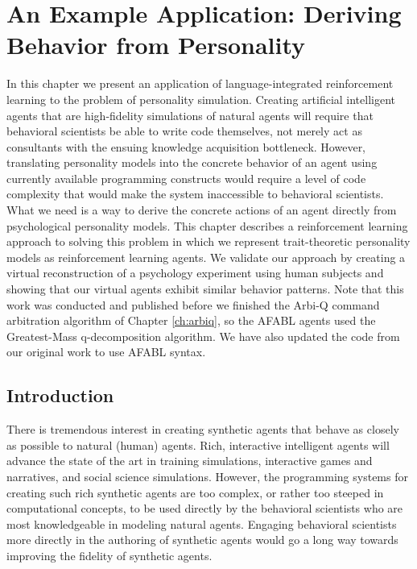 \chapter{An Example Application: Deriving Behavior from Personality}\label{ch:applications}

In this chapter we present an application of language-integrated reinforcement learning to the problem of personality simulation. Creating artificial intelligent agents that are high-fidelity simulations of natural agents will require that behavioral scientists be able to write code themselves, not merely act as consultants with the ensuing knowledge acquisition bottleneck. However, translating personality models into the concrete behavior of an agent using currently available programming constructs would require a level of code complexity that would make the system inaccessible to behavioral scientists.  What we need is a way to derive the concrete actions of an agent directly from psychological personality models.  This chapter describes a reinforcement learning approach to solving this problem in which we represent trait-theoretic personality models as reinforcement learning agents.  We validate our approach by creating a virtual reconstruction of a psychology experiment using human subjects and showing that our virtual agents exhibit similar behavior patterns. Note that this work was conducted and published before we finished the Arbi-Q command arbitration algorithm of Chapter \ref{ch:arbiq}, so the AFABL agents used the Greatest-Mass q-decomposition algorithm. We have also updated the code from our original work to use AFABL syntax.


\section{Introduction}

There is tremendous interest in creating synthetic agents that behave as closely as possible to natural (human) agents.  Rich, interactive intelligent agents will advance the state of the art in training simulations, interactive games and narratives, and social science simulations.  However, the programming systems for creating such rich synthetic agents are too complex, or rather too steeped in computational concepts, to be used directly by the behavioral scientists who are most knowledgeable in modeling natural agents. Engaging behavioral scientists more directly in the authoring of synthetic agents would go a long way towards improving the fidelity of synthetic agents.

